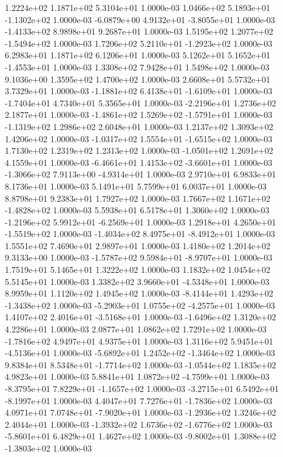 1.2224e+02 1.1871e+02 5.3104e+01  1.0000e-03
 1.0466e+02  5.1893e+01 -1.1302e+02  1.0000e-03
-6.0879e+00  4.9132e+01 -3.8055e+01  1.0000e-03
-1.4133e+02  8.9898e+01  9.2687e+01  1.0000e-03
 1.5195e+02  1.2077e+02 -1.5494e+02  1.0000e-03
 1.7206e+02  5.2110e+01 -1.2923e+02  1.0000e-03
6.2983e+01 1.1871e+02 6.1206e+01  1.0000e-03
 5.1262e+01  5.1652e+01 -1.4553e+01  1.0000e-03
1.3308e+02 7.9428e+01 1.5498e+02  1.0000e-03
9.1036e+00 1.3595e+02 1.4700e+02  1.0000e-03
2.6608e+01 5.5732e+01 3.7329e+01  1.0000e-03
-1.1881e+02  6.4138e+01 -1.6109e+01  1.0000e-03
-1.7404e+01  4.7340e+01  5.3565e+01  1.0000e-03
-2.2196e+01  1.2736e+02  2.1877e+01  1.0000e-03
-1.4861e+02  1.5269e+02 -1.5791e+01  1.0000e-03
-1.1319e+02  1.2986e+02  2.6048e+01  1.0000e-03
1.2137e+02 1.3093e+02 1.4206e+02  1.0000e-03
-1.0317e+02  1.5554e+01 -1.6515e+02  1.0000e-03
1.7130e+02 1.2319e+02 1.2313e+02  1.0000e-03
-1.0501e+02  1.2691e+02  4.1559e+01  1.0000e-03
-6.4661e+01  1.4153e+02 -3.6601e+01  1.0000e-03
-1.3066e+02  7.9113e+00 -4.9314e+01  1.0000e-03
2.9710e+01 6.9833e+01 8.1736e+01  1.0000e-03
5.1491e+01 5.7599e+01 6.0037e+01  1.0000e-03
8.8798e+01 9.2383e+01 1.7927e+02  1.0000e-03
 1.7667e+02  1.1671e+02 -1.4828e+02  1.0000e-03
5.5938e+01 6.5178e+01 1.3060e+02  1.0000e-03
-1.2196e+02  5.9912e+01 -6.2569e+01  1.0000e-03
 1.2918e+01  4.2650e+01 -1.5519e+02  1.0000e-03
-1.4034e+02  8.4975e+01 -8.4912e+01  1.0000e-03
1.5551e+02 7.4690e+01 2.9897e+01  1.0000e-03
1.4180e+02 1.2014e+02 9.3133e+00  1.0000e-03
-1.5787e+02  9.5984e+01 -8.9707e+01  1.0000e-03
1.7519e+01 5.1465e+01 1.3222e+02  1.0000e-03
1.1832e+02 1.0454e+02 5.5145e+01  1.0000e-03
 1.3382e+02  3.9660e+01 -4.5348e+01  1.0000e-03
8.9959e+01 1.1120e+02 1.4945e+02  1.0000e-03
-8.4144e+01  1.4293e+02 -1.3438e+02  1.0000e-03
-5.2903e+01  1.0755e+02 -4.2575e+01  1.0000e-03
 1.4107e+02  2.4016e+01 -3.5168e+01  1.0000e-03
-1.6496e+02  1.3120e+02  4.2286e+01  1.0000e-03
2.0877e+01 1.0862e+02 1.7291e+02  1.0000e-03
-1.7816e+02  4.9497e+01  4.9375e+01  1.0000e-03
 1.3116e+02  5.9451e+01 -4.5136e+01  1.0000e-03
-5.6892e+01  1.2452e+02 -1.3464e+02  1.0000e-03
 9.8384e+01  8.5348e+01 -1.7714e+02  1.0000e-03
-1.0544e+02  1.1835e+02  4.9823e+01  1.0000e-03
 5.8841e+01  1.0872e+02 -4.7599e+01  1.0000e-03
-8.3795e+01  7.8229e+01 -1.1657e+02  1.0000e-03
-3.2715e+01  6.5492e+01 -8.1997e+01  1.0000e-03
 4.4047e+01  7.7276e+01 -1.7836e+02  1.0000e-03
 4.0971e+01  7.0748e+01 -7.9020e+01  1.0000e-03
-1.2936e+02  1.3246e+02  2.4044e+01  1.0000e-03
-1.3932e+02  1.6736e+02 -1.6776e+02  1.0000e-03
-5.8601e+01  6.4829e+01  1.4627e+02  1.0000e-03
-9.8002e+01  1.3088e+02 -1.3803e+02  1.0000e-03
